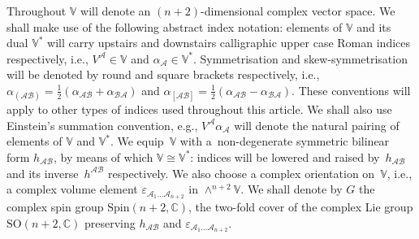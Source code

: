 \documentclass[pdftex]{sigma}
\numberwithin{equation}{section}
\newcommand{\mc} [1]{\mathcal{#1}}
\newcommand{\Spin} {\mathrm{Spin}}
\newcommand{\SO} {\mathrm{SO}}
\newcommand{\C} {\mathbb{C}}
\newcommand{\V} {\mathbb{V}}
\begin{document}
 Throughout $\V$ will denote an $(n+2)$-dimensional complex vector space. We shall make use of the following abstract index notation: elements of $\V$ and its dual $\V^*$ will carry upstairs and downstairs calligraphic upper case Roman indices respectively, i.e., $V^\mc{A} \in \V$ and \mbox{$\alpha_\mc{A} \in \V^*$}. Symmetrisation and skew-symmetrisation will be denoted by round and square brackets respectively, i.e., $\alpha_{(\mc{A} \mc{B})} = \frac{1}{2} (\alpha_{\mc{A} \mc{B}} + \alpha_{\mc{B} \mc{A}})$ and $\alpha_{[\mc{A} \mc{B}]} = \frac{1}{2} (\alpha_{\mc{A} \mc{B}} - \alpha_{\mc{B} \mc{A}})$. These conventions will apply to other types of indices used throughout this article. We shall also use Einstein's summation convention, e.g., $V^\mc{A} \alpha_\mc{A}$ will denote the natural pairing of elements of $\V$ and $\V^*$. We equip~$\V$ with a~non-degenerate symmetric bilinear form $h_{\mc{A} \mc{B}}$, by means of which $\V \cong \V^*$: indices will be lowered and raised by~$h_{\mc{A} \mc{B}}$ and its inverse~$h^{\mc{A} \mc{B}}$ respectively. We also choose a complex orientation on~$\V$, i.e., a complex volume element $\varepsilon_{\mc{A}_1 \ldots \mc{A}_{n+2}}$ in $\wedge^{n+2} \V$. We shall denote by $G$ the complex spin group $\Spin(n+2,\C)$, the two-fold cover of the complex Lie group $\SO(n+2,\C)$ preserving $h_{\mc{A} \mc{B}}$ and $\varepsilon_{\mc{A}_1 \ldots \mc{A}_{n+2}}$.
\end{document}
